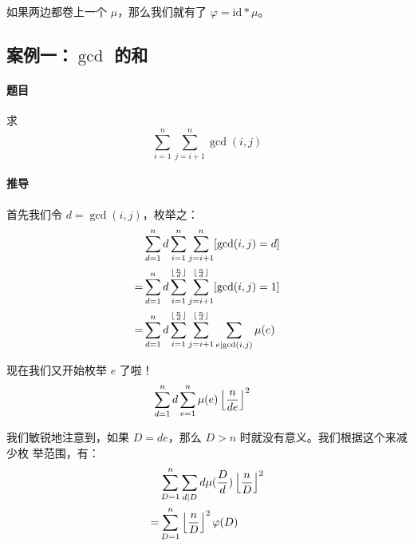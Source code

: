 如果两边都卷上一个 $\mu$，那么我们就有了 $\varphi = \mathrm{id} * \mu$。

\subsection{案例一：$\gcd$ 的和}
\paragraph{题目} 求 \[
    \sum_{i=1}^{n} \sum_{j=i+1}^{n} \gcd(i, j)
\]

\paragraph{推导} 首先我们令 $d = \gcd(i, j)$，枚举之：\begin{align*}
     & \sum_{d=1}^{n} d \sum_{i=1}^{n} \sum_{j=i+1}^{n} [\gcd(i, j) = d]\\
    =& \sum_{d=1}^{n} d \sum_{i=1}^{\lfloor{n \over d}\rfloor}
    \sum_{j=i+1}^{\lfloor{n \over d}\rfloor} [\gcd(i, j) = 1] \\
    =& \sum_{d=1}^{n} d \sum_{i=1}^{\lfloor{n \over d}\rfloor}
    \sum_{j=i+1}^{\lfloor{n \over d}\rfloor} \sum_{e \mid \gcd(i, j)} \mu(e)
\end{align*}

现在我们又开始枚举 $e$ 了啦！\begin{align*}
    & \sum_{d=1}^{n} d \sum_{e=1}^{n} \mu(e) \left\lfloor{n \over de}\right\rfloor^2
\end{align*}

我们敏锐地注意到，如果 $D = de$，那么 $D > n$ 时就没有意义。我们根据这个来减少枚
举范围，有：\begin{align*}
    & \sum_{D=1}^{n} \sum_{d \mid D} d \mu({D \over d}) \left\lfloor{n \over D}\right\rfloor^2 \\
    = & \sum_{D=1}^{n} \left\lfloor{n \over D}\right\rfloor^2 \varphi(D) 
\end{align*}
